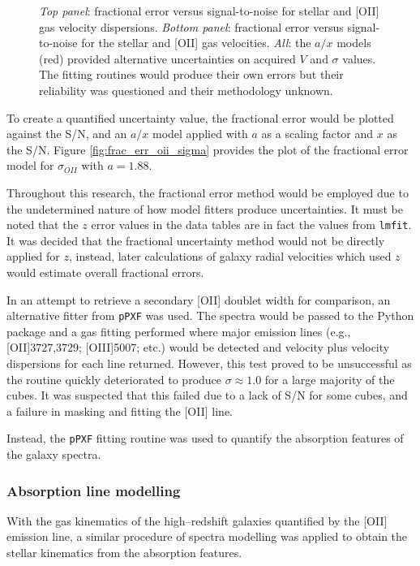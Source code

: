 \documentclass[12pt, twocolumn, nofootinbib]{revtex4-1}    %
\begin{document}
\begin{figure}
{  \label{fig:frac_err_stellar_vel}
  }
\captionsetup{justification=raggedright}
\caption[Fractional uncertainties]{\textit{Top panel}: fractional error versus signal-to-noise for stellar and [OII] gas velocity dispersions. \textit{Bottom panel}: fractional error versus signal-to-noise for the stellar and [OII] gas velocities. \textit{All}: the $a/x$ models (red) provided alternative uncertainties on acquired $V$ and $\sigma$ values. The fitting routines would produce their own errors but their reliability was questioned and their methodology unknown.}
  \label{fig:fractional_errors}
\end{figure}

To create a quantified uncertainty value, the fractional error would be plotted against the S/N, and an $a/x$ model applied with $a$ as a scaling factor and $x$ as the S/N. Figure \ref{fig:frac_err_oii_sigma} provides the plot of the fractional error model for $\sigma_{OII}$ with $a=1.88$. 

Throughout this research, the fractional error method would be employed due to the undetermined nature of how model fitters produce uncertainties. It must be noted that the $z$ error values in the data tables are in fact the values from \texttt{lmfit}. It was decided that the fractional uncertainty method would not be directly applied for $z$, instead, later calculations of galaxy radial velocities which used $z$ would estimate overall fractional errors.

In an attempt to retrieve a secondary [OII] doublet width for comparison, an alternative fitter from \texttt{pPXF} was used. The spectra would be passed to the Python package and a gas fitting performed where major emission lines (e.g., [OII]3727,3729; [OIII]5007; etc.) would be detected and velocity plus velocity dispersions for each line returned. However, this test proved to be unsuccessful as the routine quickly deteriorated to produce $\sigma\approx1.0$ for a large majority of the cubes. It was suspected that this failed due to a lack of S/N for some cubes, and a failure in masking and fitting the [OII] line.

Instead, the \texttt{pPXF} fitting routine was used to quantify the absorption features of the galaxy spectra. 

\vspace{2ex} %
\subsubsection{Absorption line modelling}
\noindent
With the gas kinematics of the high--redshift galaxies quantified by the [OII] emission line, a similar procedure of spectra modelling was applied to obtain the stellar kinematics from the absorption features.
\end{document}
